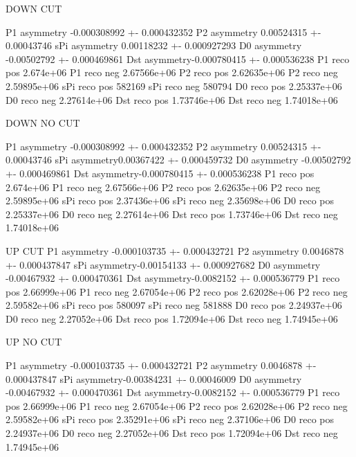 DOWN CUT 

P1 asymmetry -0.000308992 +- 0.000432352
P2 asymmetry 0.00524315 +- 0.00043746
sPi asymmetry 0.00118232 +- 0.000927293
D0 asymmetry -0.00502792 +- 0.000469861
Dst asymmetry-0.000780415 +- 0.000536238
P1 reco pos 2.674e+06 P1 reco neg 2.67566e+06
P2 reco pos 2.62635e+06 P2 reco neg 2.59895e+06
sPi reco pos 582169 sPi reco neg 580794
D0 reco pos 2.25337e+06 D0 reco neg 2.27614e+06
Dst reco pos 1.73746e+06 Dst reco neg 1.74018e+06

DOWN NO CUT

P1 asymmetry -0.000308992 +- 0.000432352
P2 asymmetry 0.00524315 +- 0.00043746
sPi asymmetry0.00367422 +- 0.000459732
D0 asymmetry -0.00502792 +- 0.000469861
Dst asymmetry-0.000780415 +- 0.000536238
P1 reco pos 2.674e+06 P1 reco neg 2.67566e+06
P2 reco pos 2.62635e+06 P2 reco neg 2.59895e+06
sPi reco pos 2.37436e+06 sPi reco neg 2.35698e+06
D0 reco pos 2.25337e+06 D0 reco neg 2.27614e+06
Dst reco pos 1.73746e+06 Dst reco neg 1.74018e+06

UP CUT
P1 asymmetry -0.000103735 +- 0.000432721
P2 asymmetry 0.0046878 +- 0.000437847
sPi asymmetry-0.00154133 +- 0.000927682
D0 asymmetry -0.00467932 +- 0.000470361
Dst asymmetry-0.0082152 +- 0.000536779
P1 reco pos 2.66999e+06 P1 reco neg 2.67054e+06
P2 reco pos 2.62028e+06 P2 reco neg 2.59582e+06
sPi reco pos 580097 sPi reco neg 581888
D0 reco pos 2.24937e+06 D0 reco neg 2.27052e+06
Dst reco pos 1.72094e+06 Dst reco neg 1.74945e+06

UP NO CUT

P1 asymmetry -0.000103735 +- 0.000432721
P2 asymmetry 0.0046878 +- 0.000437847
sPi asymmetry-0.00384231 +- 0.00046009
D0 asymmetry -0.00467932 +- 0.000470361
Dst asymmetry-0.0082152 +- 0.000536779
P1 reco pos 2.66999e+06 P1 reco neg 2.67054e+06
P2 reco pos 2.62028e+06 P2 reco neg 2.59582e+06
sPi reco pos 2.35291e+06 sPi reco neg 2.37106e+06
D0 reco pos 2.24937e+06 D0 reco neg 2.27052e+06
Dst reco pos 1.72094e+06 Dst reco neg 1.74945e+06
